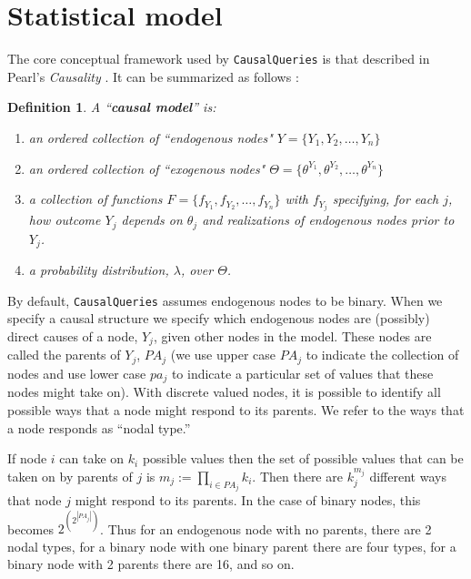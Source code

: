 \documentclass[
  11pt,
  article]{jss}
\newtheorem{definition}{Definition}
\begin{document}
\section{Statistical model}\label{sec-theory}

The core conceptual framework used by \texttt{CausalQueries} is that
described in Pearl's \emph{Causality} \citep{pearl_causality_2009}. It
can be summarized as follows \citep[using notation
from][]{humphreys_integrated_2023}:

\begin{definition}
  
  A ``\textbf{causal model}'' is:
  \begin{enumerate}
    \item an ordered collection of ``endogenous nodes" $Y = \{Y_1, Y_2, \dots, Y_n\}$
    \item an ordered collection of ``exogenous nodes" $\Theta = \{\theta^{Y_1}, \theta^{Y_2}, \dots, \theta^{Y_n}\}$
    \item a collection of functions $F = \{f_{Y_1}, f_{Y_2}, \dots, f_{Y_n}\}$ with $f_{Y_j}$ specifying, for each $j$, how outcome $Y_j$ depends on $\theta_j$ and realizations of endogenous nodes prior to $Y_j$.
    \item a probability distribution, $\lambda$, over $\Theta$.
  \end{enumerate}
  
\end{definition}

By default, \texttt{CausalQueries} assumes endogenous nodes to be
binary. When we specify a causal structure we specify which endogenous
nodes are (possibly) direct causes of a node, \(Y_j\), given other nodes
in the model. These nodes are called the parents of \(Y_j\), \(PA_j\)
(we use upper case \(PA_j\) to indicate the collection of nodes and use
lower case \(pa_j\) to indicate a particular set of values that these
nodes might take on). With discrete valued nodes, it is possible to
identify all possible ways that a node might respond to its parents. We
refer to the ways that a node responds as ``nodal type.''

If node \(i\) can take on \(k_i\) possible values then the set of
possible values that can be taken on by parents of \(j\) is
\(m_j :=\prod_{i\in PA_j}k_i\). Then there are \(k_j^{m_j}\) different
ways that node \(j\) might respond to its parents. In the case of binary
nodes, this becomes \(2^{\left(2^{|PA_j|}\right)}\). Thus for an
endogenous node with no parents, there are 2 nodal types, for a binary
node with one binary parent there are four types, for a binary node with
2 parents there are 16, and so on.
\end{document}
